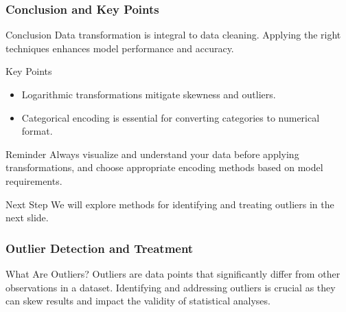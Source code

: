 \documentclass[aspectratio=169]{beamer}
\begin{document}
\begin{frame}[fragile]
    \frametitle{Conclusion and Key Points}
    \begin{block}{Conclusion}
        Data transformation is integral to data cleaning. Applying the right techniques enhances model performance and accuracy.
    \end{block}

    \begin{block}{Key Points}
        \begin{itemize}
            \item Logarithmic transformations mitigate skewness and outliers.
            \item Categorical encoding is essential for converting categories to numerical format.
        \end{itemize}
    \end{block}

    \begin{block}{Reminder}
        Always visualize and understand your data before applying transformations, and choose appropriate encoding methods based on model requirements.
    \end{block}

    \begin{block}{Next Step}
        We will explore methods for identifying and treating outliers in the next slide.
    \end{block}
\end{frame}

\begin{frame}[fragile]
    \frametitle{Outlier Detection and Treatment}
    \begin{block}{What Are Outliers?}
        Outliers are data points that significantly differ from other observations in a dataset. 
        Identifying and addressing outliers is crucial as they can skew results and impact the validity of statistical analyses.
    \end{block}
\end{frame}
\end{document}
